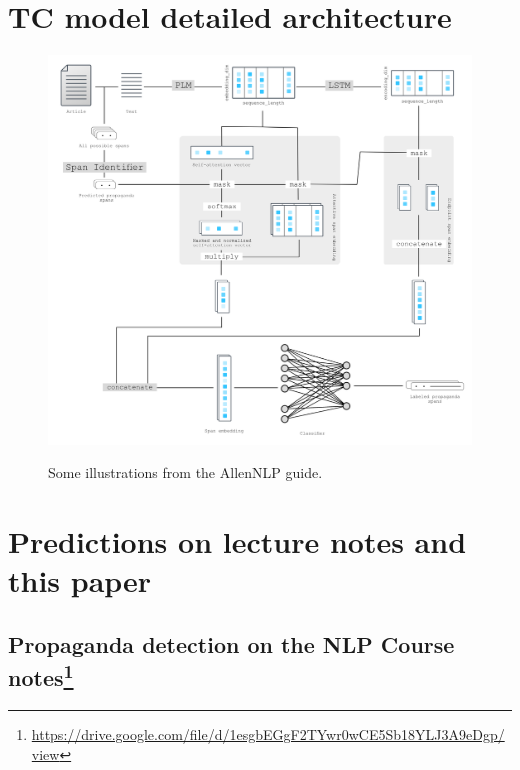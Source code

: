 \documentclass[11pt]{article}
\newcommand{\pol}[1]{{\fontfamily{pcr}\selectfont#1}}
\begin{document}
\begin{appendices}
\section{\pol{TC} model detailed architecture} \label{app:tc}
\begin{figure}[h]
    \centering
    \includegraphics[width=\textwidth]{images/tc.png}
    \label{fig:tc-architecture}
    \caption{Some illustrations from the \pol{AllenNLP} guide.}
\end{figure}

\clearpage
\pagebreak
\section{Predictions on lecture notes and this paper} \label{app:preds}

\subsection{Propaganda detection on the NLP Course notes\footnote{\url{https://drive.google.com/file/d/1esgbEGgF2TYwr0wCE5Sb18YLJ3A9eDgp/view}}}


\end{appendices}
\end{document}
